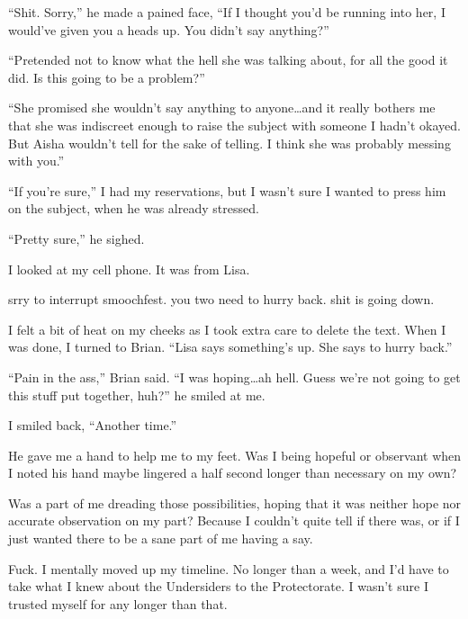 ``Shit.  Sorry,'' he made a pained face, ``If I thought you'd be running into her, I would've given you a heads up.  You didn't say anything?''



``Pretended not to know what the hell she was talking about, for all the good it did.  Is this going to be a problem?''



``She promised she wouldn't say anything to anyone\ldots and it really bothers me that she was indiscreet enough to raise the subject with someone I hadn't okayed.  But Aisha wouldn't tell for the sake of telling.  I think she was probably messing with you.''



``If you're sure,'' I had my reservations, but I wasn't sure I wanted to press him on the subject, when he was already stressed.



``Pretty sure,'' he sighed.



I looked at my cell phone.  It was from Lisa.



srry to interrupt smoochfest. you two need to hurry back.  shit is going down.



I felt a bit of heat on my cheeks as I took extra care to delete the text.  When I was done, I turned to Brian.  ``Lisa says something's up.  She says to hurry back.''



``Pain in the ass,'' Brian said.  ``I was hoping\ldots ah hell.  Guess we're not going to get this stuff put together, huh?'' he smiled at me.



I smiled back, ``Another time.''



He gave me a hand to help me to my feet.  Was I being hopeful or observant when I noted his hand maybe lingered a half second longer than necessary on my own?



Was a part of me dreading those possibilities, hoping that it was neither hope nor accurate observation on my part?  Because I couldn't quite tell if there was, or if I just wanted there to be a sane part of me having a say.



Fuck.  I mentally moved up my timeline.  No longer than a week, and I'd have to take what I knew about the Undersiders to the Protectorate.  I wasn't sure I trusted myself for any longer than that.





